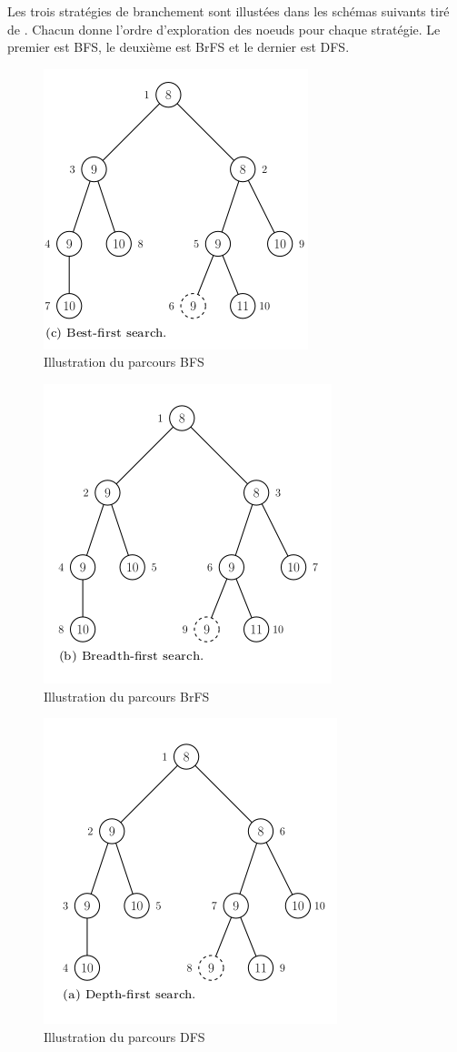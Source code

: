 \documentclass[12pt,a4paper,oneside]{book}
\theoremstyle{definition}
\begin{document}
     Les trois stratégies de branchement sont illustées dans les schémas suivants tiré de \cite{Clausen99branchand}. Chacun donne l'ordre d'exploration des noeuds pour chaque stratégie. Le premier est BFS, le deuxième est BrFS et le dernier est DFS. 
    \begin{figure}[H]
		\centering
		\includegraphics[width=0.5\linewidth]{BFS.png}
		\caption{Illustration du parcours BFS}
	\end{figure}
	\begin{figure}[H]
		\centering
		\includegraphics[width=0.5\linewidth]{BrFS.png}
		\caption{Illustration du parcours BrFS}
	\end{figure}
	\begin{figure}[H]
		\centering
		\includegraphics[width=0.5\linewidth]{DFS.png}
		\caption{Illustration du parcours DFS}
	\end{figure}
\end{document}
